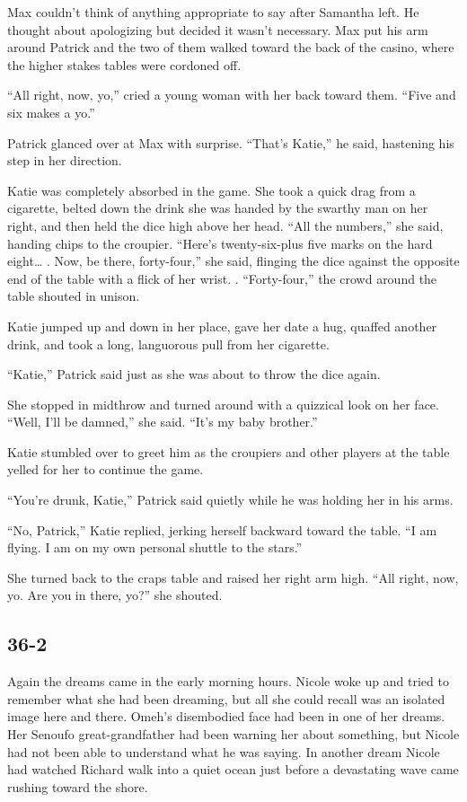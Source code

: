 \documentclass[]{article}
\begin{document}
{Max couldn’t think of anything appropriate to say after Samantha left.  He thought about apologizing but decided it wasn’t necessary.  Max put his arm around Patrick and the two of them walked toward the back of the casino, where the higher stakes tables were cordoned off.

“All right, now, yo,” cried a young woman with her back toward them.  “Five and six makes a yo.”

Patrick glanced over at Max with surprise.  “That’s Katie,” he said, hastening his step in her direction.

Katie was completely absorbed in the game.  She took a quick drag from a cigarette, belted down the drink she was handed by the swarthy man on her right, and then held the dice high above her head.  “All the numbers,” she said, handing chips to the croupier.  “Here’s twenty-six-plus five marks on the hard eight… .  Now, be there, forty-four,” she said, flinging the dice against the opposite end of the table with a flick of her wrist.  .  “Forty-four,” the crowd around the table shouted in unison.

Katie jumped up and down in her place, gave her date a hug, quaffed another drink, and took a long, languorous pull from her cigarette.

“Katie,” Patrick said just as she was about to throw the dice again.

She stopped in midthrow and turned around with a quizzical look on her face.  “Well, I’ll be damned,” she said.  “It’s my baby brother.”

Katie stumbled over to greet him as the croupiers and other players at the table yelled for her to continue the game.

“You’re drunk, Katie,” Patrick said quietly while he was holding her in his arms.

“No, Patrick,” Katie replied, jerking herself backward toward the table.  “I am flying.  I am on my own personal shuttle to the stars.”

She turned back to the craps table and raised her right arm high.  “All right, now, yo.  Are you in there, yo?” she shouted.


\subsection*{36-2}

Again the dreams came in the early morning hours.  Nicole woke up and tried to remember what she had been dreaming, but all she could recall was an isolated image here and there.  Omeh’s disembodied face had been in one of her dreams.  Her Senoufo great-grandfather had been warning her about something, but Nicole had not been able to understand what he was saying.  In another dream Nicole had watched Richard walk into a quiet ocean just before a devastating wave came rushing toward the shore.

}
\end{document}
